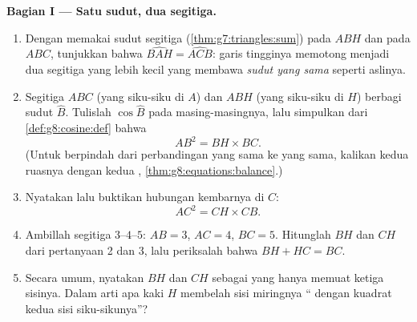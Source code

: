 \begin{problem}[{Soal akhir pekan --- garis tinggi segitiga
siku-siku: $AB^2 = BH \times BC$, $AH^2 = BH \times HC$, bukti kedua
Pythagoras, dan mesin untuk melukis akar kuadrat}]
\medskip
\noindent\textbf{Bagian I --- Satu sudut, dua segitiga.}
\begin{enumerate}
  \item Dengan memakai  sudut segitiga
        (\cref{thm:g7:triangles:sum}) pada $ABH$ dan pada $ABC$,
        tunjukkan bahwa $\widehat{BAH} = \widehat{ACB}$: garis
        tingginya memotong  menjadi dua segitiga
        yang lebih kecil yang membawa \emph{sudut yang sama} seperti
        aslinya.
  \item Segitiga $ABC$ (yang siku-siku di $A$) dan $ABH$
        (yang siku-siku di $H$) berbagi sudut $\widehat B$. Tulislah
        $\cos\widehat B$ pada masing-masingnya, lalu simpulkan dari
        \cref{def:g8:cosine:def} bahwa
        \[
        AB^2 = BH \times BC .
        \]
        (Untuk berpindah dari perbandingan yang sama ke 
        yang sama, kalikan kedua ruasnya dengan kedua ,
        \cref{thm:g8:equations:balance}.)
  \item Nyatakan lalu buktikan hubungan kembarnya di  $C$:
        \[
        AC^2 = CH \times CB .
        \]
  \item Ambillah segitiga $3$--$4$--$5$: $AB = 3$, $AC = 4$,
        $BC = 5$. Hitunglah $BH$ dan $CH$ dari pertanyaan 2 dan 3,
        lalu periksalah bahwa $BH + HC = BC$.
  \item Secara umum, nyatakan $BH$ dan $CH$ sebagai  yang
        hanya memuat ketiga sisinya. Dalam arti apa kaki $H$
        membelah sisi miringnya `` dengan kuadrat kedua
        sisi siku-sikunya''?
\end{enumerate}


\end{problem}
